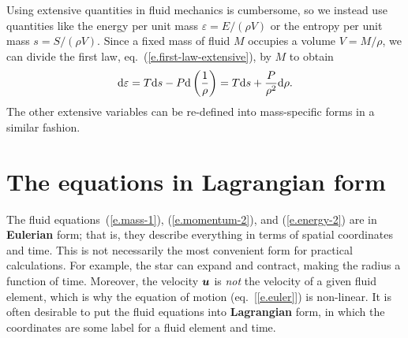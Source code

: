Using extensive quantities in fluid mechanics is cumbersome, so we instead use quantities like the energy per unit mass $\varepsilon  = E/(\rho V)$ or the entropy per unit mass $s = S/(\rho V)$. Since a fixed mass of fluid $M$ occupies a volume $V = M/\rho$, we can divide the first law, eq.~(\ref{e.first-law-extensive}), by $M$ to obtain
\begin{equation}\label{e.first-law-intensive}
\mathrm{d} \varepsilon = T\mathrm{d} s - P\mathrm{d}\left(\frac{1}{\rho}\right) = T\mathrm{d} s + \frac{P}{\rho^{2}}\mathrm{d} \rho.
\end{equation}
The other extensive variables can be re-defined into mass-specific forms in a similar fashion.

\section{The equations in Lagrangian form}

The fluid equations~(\ref{e.mass-1}), (\ref{e.momentum-2}), and (\ref{e.energy-2}) are in \textbf{Eulerian} form; that is, they describe everything in terms of spatial coordinates and time. This is not necessarily the most convenient form for  practical calculations. For example, the star can expand and contract, making the radius a function of time. Moreover, the velocity $\boldsymbol{u}$ is \emph{not} the velocity of a given fluid element, which is why the equation of motion (eq.~[\ref{e.euler}]) is non-linear. It is often desirable to put the fluid equations into \textbf{Lagrangian} form, in which the coordinates are some label for a fluid element and time.

